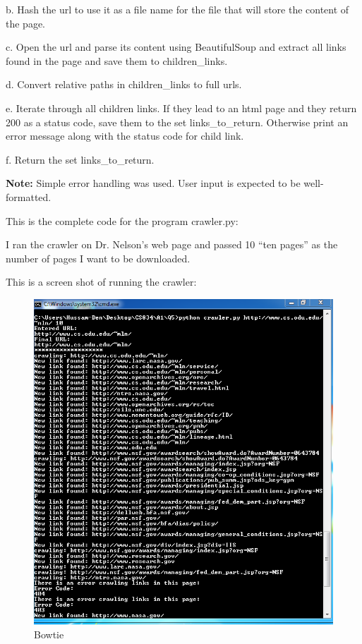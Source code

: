 \documentclass[a4paper, 11pt]{article}
\begin{document}
b. Hash the url to use it as a file name for the file that will store the content of the page.

c. Open the url and parse its content using BeautifulSoup and extract all links found in the page and save them to children\_links.

d. Convert relative paths in children\_links to full urls.

e. Iterate through all children links. If they lead to an html page and they return 200 as a status code, save them to the set links\_to\_return. Otherwise print an error message along with the status code for child link.

f. Return the set links\_to\_return.

\textbf{Note:} Simple error handling was used. User input is expected to be well-formatted.

This is the complete code for the program crawler.py:




I ran the crawler on Dr. Nelson's web page and passed 10 ``ten pages'' as the number of pages I want to be downloaded.

This is a screen shot of running the crawler:

\begin{figure}[h]
\caption{Bowtie}
\centering
\includegraphics[scale=0.7]{Q5/crawler.png}
\end{figure}
\end{document}
